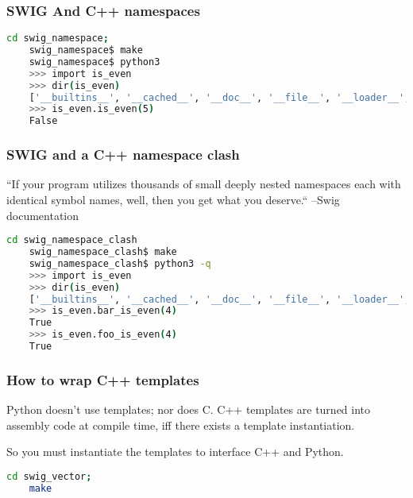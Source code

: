 \documentclass{beamer}
\begin{document}
\begin{frame}[fragile]
  \frametitle{SWIG And C++ namespaces}
  \begin{lstlisting}[language=bash]
    cd swig_namespace;
    swig_namespace$ make
    swig_namespace$ python3
    >>> import is_even
    >>> dir(is_even)
    ['__builtins__', '__cached__', '__doc__', '__file__', '__loader__', '__name__', '__package__', '__spec__', '_is_even', '_newclass', '_object', '_swig      _getattr', '_swig_getattr_nondynamic', '_swig_property', '_swig_repr', '_swig_setattr', '_swig_setattr_nondynamic', 'is_even']
    >>> is_even.is_even(5)
    False
  \end{lstlisting}
\end{frame}

\begin{frame}[fragile]
  \frametitle{SWIG and a C++ namespace clash}
  ``If your program utilizes thousands of small deeply nested namespaces each with identical symbol names, well, then
  you get what you deserve.`` --Swig documentation
  \begin{lstlisting}[language=bash]
    cd swig_namespace_clash
    swig_namespace_clash$ make
    swig_namespace_clash$ python3 -q
    >>> import is_even
    >>> dir(is_even)
    ['__builtins__', '__cached__', '__doc__', '__file__', '__loader__', '__name__', '__package__', '__spec__', '_is_even', '_newclass', '_object', '_swig_getattr', '_swig_getattr_nondynamic', '_swig_property', '_swig_repr', '_swig_setattr', '_swig_setattr_nondynamic', 'bar_is_even', 'foo_is_even']
    >>> is_even.bar_is_even(4)
    True
    >>> is_even.foo_is_even(4)
    True
   \end{lstlisting}
\end{frame}


\begin{frame}[fragile]
  \frametitle{How to wrap C++ templates}

  Python doesn't use templates; nor does C. C++ templates are turned into assembly code at compile time, iff there exists a template instantiation.

  So you must instantiate the templates to interface C++ and Python.

  \begin{lstlisting}[language=bash]
    cd swig_vector;
    make
  \end{lstlisting}

\end{frame}
\end{document}
